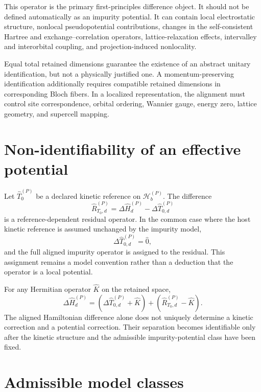 This operator is the primary first-principles difference object. It should not
be defined automatically as an impurity potential. It can contain local
electrostatic structure, nonlocal pseudopotential contributions, changes in the
self-consistent Hartree and exchange--correlation operators,
lattice-relaxation effects, intervalley and interorbital coupling, and
projection-induced nonlocality.

Equal total retained dimensions guarantee the existence of an abstract unitary
identification, but not a physically justified one. A momentum-preserving
identification additionally requires compatible retained dimensions in
corresponding Bloch fibers. In a localized representation, the alignment must
control site correspondence, orbital ordering, Wannier gauge, energy zero,
lattice geometry, and supercell mapping.

\section*{Non-identifiability of an effective potential}

Let $\hat T_0^{(P)}$ be a declared kinetic reference on
$\mathcal H_b^{(P)}$. The difference
\begin{equation}
    \hat R_{T_0,d}^{(P)}
    =
    \Delta\hat H_d^{(P)}
    -
    \Delta\hat T_{0,d}^{(P)}
\end{equation}
is a reference-dependent residual operator. In the common case where the host
kinetic reference is assumed unchanged by the impurity model,
\begin{equation}
    \Delta\hat T_{0,d}^{(P)}=\hat 0,
\end{equation}
and the full aligned impurity operator is assigned to the residual. This
assignment remains a model convention rather than a deduction that the
operator is a local potential.

For any Hermitian operator $\hat K$ on the retained space,
\begin{equation}
    \Delta\hat H_d^{(P)}
    =
    \left(
        \Delta\hat T_{0,d}^{(P)}+\hat K
    \right)
    +
    \left(
        \hat R_{T_0,d}^{(P)}-\hat K
    \right).
\end{equation}
The aligned Hamiltonian difference alone does not uniquely determine a kinetic
correction and a potential correction. Their separation becomes identifiable
only after the kinetic structure and the admissible impurity-potential class
have been fixed.

\section*{Admissible model classes}


